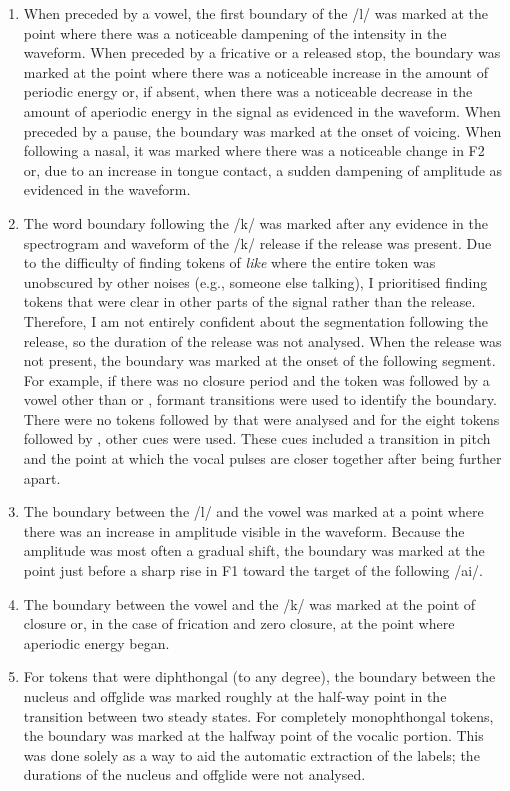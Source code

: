 \begin{enumerate}
	\item When preceded by a vowel, the first boundary of the /l/ was marked at the point where there was a noticeable dampening of the intensity in the waveform. When preceded by a fricative or a released stop, the boundary was marked at the point where there was a noticeable increase in the amount of periodic energy or, if absent, when there was a noticeable decrease in the amount of aperiodic energy in the signal as evidenced in the waveform. When preceded by a pause, the boundary was marked at the onset of voicing. When following a nasal, it was marked where there was a noticeable change in F2 or, due to an increase in tongue contact, a sudden dampening of amplitude as evidenced in the waveform.
\largerpage
	\item The word boundary following the /k/ was marked after any evidence in the spectrogram and waveform of the /k/ release if the release was present. Due to the difficulty of finding tokens of \textit{like} where the entire token was unobscured by other noises (e.g., someone else talking), I prioritised finding tokens that were clear in other parts of the signal rather than the release. Therefore, I am not entirely confident about the segmentation following the release, so the duration of the release was not analysed. When the release was not present, the boundary was marked at the onset of the following segment. For example, if there was no closure period and the token was followed by a vowel other than  or , formant transitions were used to identify the boundary. There were no tokens followed by  that were analysed and for the eight tokens followed by , other cues were used. These cues included a transition in pitch and the point at which the vocal pulses are closer together after being further apart.
	\item The boundary between the /l/ and the vowel was marked at a point where there was an increase in amplitude visible in the waveform. Because the amplitude was most often a gradual shift, the boundary was marked at the point just before a sharp rise in F1 toward the target of the following /ai/.
	\item The boundary between the vowel and the /k/ was marked at the point of closure or, in the case of frication and zero closure, at the point where aperiodic energy began.
	\item For tokens that were diphthongal (to any degree), the boundary between the nucleus and offglide was marked roughly at the half-way point in the transition between two steady states. For completely monophthongal tokens, the boundary was marked at the halfway point of the vocalic portion. This was done solely as a way to aid the automatic extraction of the labels; the durations of the nucleus and offglide were not analysed.
	
\end{enumerate}

